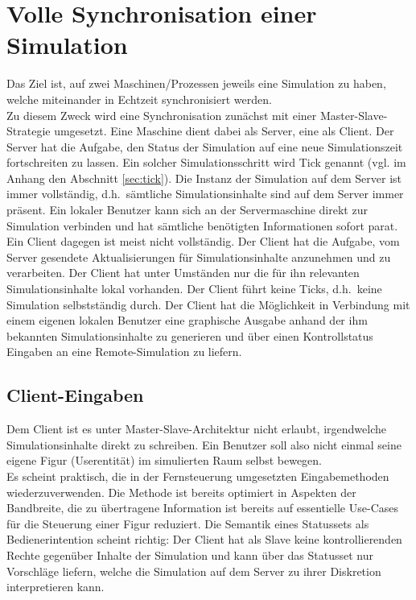 \section{Volle Synchronisation einer Simulation}
Das Ziel ist, auf zwei Maschinen/Prozessen jeweils eine Simulation zu haben, welche miteinander in Echtzeit synchronisiert werden.\\
Zu diesem Zweck wird eine Synchronisation zunächst mit einer Master-Slave-Strategie umgesetzt. Eine Maschine dient dabei als Server, eine als Client.
Der Server hat die Aufgabe, den Status der Simulation auf eine neue Simulationszeit fortschreiten zu lassen. Ein solcher Simulationsschritt wird Tick genannt (vgl. im Anhang den Abschnitt \ref{sec:tick}). Die Instanz der Simulation auf dem Server ist immer vollständig, d.h.~sämtliche Simulationsinhalte sind auf dem Server immer präsent. Ein lokaler Benutzer kann sich an der Servermaschine direkt zur Simulation verbinden und hat sämtliche benötigten Informationen sofort parat.\\
Ein Client dagegen ist meist nicht vollständig. Der Client hat die Aufgabe, vom Server gesendete Aktualisierungen für Simulationsinhalte anzunehmen und zu verarbeiten. Der Client hat unter Umständen nur die für ihn relevanten Simulationsinhalte lokal vorhanden. Der Client führt keine Ticks, d.h.~keine Simulation selbstständig durch. Der Client hat die Möglichkeit in Verbindung mit einem eigenen lokalen Benutzer eine graphische Ausgabe anhand der ihm bekannten Simulationsinhalte zu generieren und über einen Kontrollstatus Eingaben an eine Remote-Simulation zu liefern. 

\subsection{Client-Eingaben}
Dem Client ist es unter Master-Slave-Architektur nicht erlaubt, irgendwelche Simulationsinhalte direkt zu schreiben. Ein Benutzer soll also nicht einmal seine eigene Figur (Userentität) im simulierten Raum selbst bewegen.\\
Es scheint praktisch, die in der Fernsteuerung umgesetzten Eingabemethoden wiederzuverwenden. Die Methode ist bereits optimiert in Aspekten der Bandbreite, die zu übertragene Information ist bereits auf essentielle Use-Cases für die Steuerung einer Figur reduziert. Die Semantik eines Statussets als Bedienerintention scheint richtig: Der Client hat als Slave keine kontrollierenden Rechte gegenüber Inhalte der Simulation und kann über das Statusset nur Vorschläge liefern, welche die Simulation auf dem Server zu ihrer Diskretion interpretieren kann.

